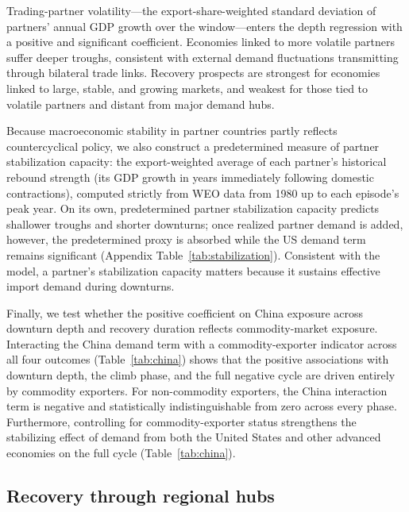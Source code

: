 \documentclass[12pt, a4paper]{article}
\begin{document}
Trading-partner volatility---the export-share-weighted standard deviation of partners' annual GDP growth over the window---enters the depth regression with a positive and significant coefficient. Economies linked to more volatile partners suffer deeper troughs, consistent with external demand fluctuations transmitting through bilateral trade links. Recovery prospects are strongest for economies linked to large, stable, and growing markets, and weakest for those tied to volatile partners and distant from major demand hubs.

Because macroeconomic stability in partner countries partly reflects countercyclical policy, we also construct a predetermined measure of partner stabilization capacity: the export-weighted average of each partner's historical rebound strength (its GDP growth in years immediately following domestic contractions), computed strictly from WEO data from 1980 up to each episode's peak year. On its own, predetermined partner stabilization capacity predicts shallower troughs and shorter downturns; once realized partner demand is added, however, the predetermined proxy is absorbed while the US demand term remains significant (Appendix Table~\ref{tab:stabilization}). Consistent with the model, a partner's stabilization capacity matters because it sustains effective import demand during downturns.

Finally, we test whether the positive coefficient on China exposure across downturn depth and recovery duration reflects commodity-market exposure. Interacting the China demand term with a commodity-exporter indicator across all four outcomes (Table~\ref{tab:china}) shows that the positive associations with downturn depth, the climb phase, and the full negative cycle are driven entirely by commodity exporters. For non-commodity exporters, the China interaction term is negative and statistically indistinguishable from zero across every phase. Furthermore, controlling for commodity-exporter status strengthens the stabilizing effect of demand from both the United States and other advanced economies on the full cycle (Table~\ref{tab:china}).

\subsection{Recovery through regional hubs}
\end{document}
